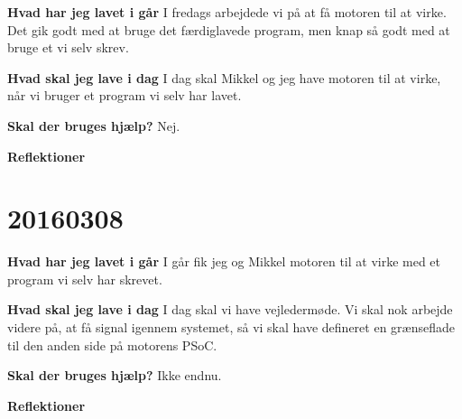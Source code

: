 \documentclass{article}
\begin{document}
	\textbf{Hvad har jeg lavet i går}
	I fredags arbejdede vi på at få motoren til at virke. Det gik godt med at bruge det færdiglavede program, men knap så godt med at bruge et vi selv skrev. 
	
	\textbf{Hvad skal jeg lave i dag}
	I dag skal Mikkel og jeg have motoren til at virke, når vi bruger et program vi selv har lavet. 
	
	\textbf{Skal der bruges hjælp?}
	Nej. 
	
	\textbf{Reflektioner}
	
	\section{20160308}
	
	\textbf{Hvad har jeg lavet i går}
	I går fik jeg og Mikkel motoren til at virke med et program vi selv har skrevet. 
	
	\textbf{Hvad skal jeg lave i dag}
	I dag skal vi have vejledermøde. Vi skal nok arbejde videre på, at få signal igennem systemet, så vi skal have defineret en grænseflade til den anden side på motorens PSoC. 
	
	\textbf{Skal der bruges hjælp?}
	Ikke endnu. 
	
	\textbf{Reflektioner}
	
\end{document}
